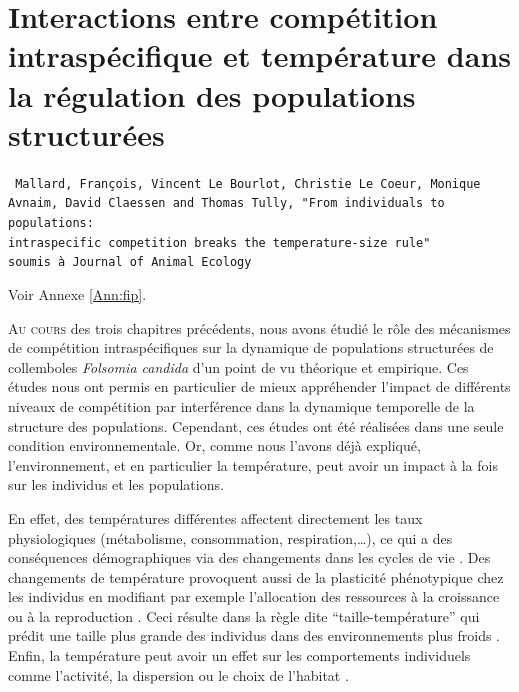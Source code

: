 \chapter{Interactions entre compétition intraspécifique et température dans la
régulation des populations structurées}
\label{chap:fip}

\vspace{2cm}
\begin{Spacing}{1}
\texttt{
Mallard, François, Vincent Le Bourlot, Christie Le Coeur, Monique Avnaim, David
Claessen and Thomas Tully, "From individuals to populations: \\intraspecific
competition breaks the temperature-size rule"\\
soumis à Journal of Animal Ecology}
\end{Spacing}
Voir Annexe \ref{Ann:fip}.
\vspace{2cm}


\lettrine[lines=3]{A}{u cours} des trois chapitres précédents, nous avons étudié
le rôle des mécanismes de compétition intraspécifiques sur la dynamique de
populations structurées de collemboles \textit{Folsomia candida} d'un point de vu théorique
et empirique. Ces études nous ont permis en particulier de mieux appréhender
l'impact de différents niveaux de compétition par interférence dans la
dynamique temporelle de la structure des populations. Cependant, ces études ont
été réalisées dans une seule condition environnementale. Or, comme nous
l'avons déjà expliqué, l'environnement, et en particulier la température, peut
avoir un impact à la fois sur les individus et les populations. 

En effet, des températures différentes affectent directement les taux
physiologiques (métabolisme, consommation, respiration,\ldots), ce qui a des
conséquences démographiques via des changements dans les cycles de vie
\autocites{gillooly2002a,le-galliard2012a}. Des changements de température
provoquent aussi de la plasticité phénotypique chez les individus en modifiant
par exemple l'allocation des ressources à la croissance ou à la reproduction
\autocites{liefting2010temperature,gutteling2007mapping}. Ceci résulte dans la
règle dite ``taille-température'' qui prédit une taille plus grande des
individus dans des environnements plus froids
\autocites{atkinson1994a,atkinson1996a,angilletta2009a}. Enfin, la température
peut avoir un effet sur les comportements individuels comme l'activité, la
dispersion ou le choix de l'habitat
\autocites{atacho2013a,bonte2008thermal,vanbeest2012temperature}.

